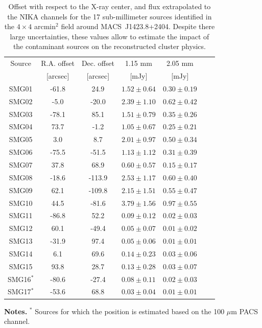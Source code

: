 \documentclass[twocolumn,traditabstract]{aa}
\begin{document}
\begin{table}[h]
\caption{Offset with respect to the X-ray center, and flux extrapolated to the NIKA channels for the 17 sub-millimeter sources identified in the $4 \times 4$ arcmin$^2$ field around \mbox{MACS~J1423.8+2404}. Despite there large uncertainties, these values allow to estimate the impact of the contaminant sources on the reconstructed cluster physics.}
\begin{center}
\begin{tabular}{ccccccc}
\hline
\hline
Source &  R.A. offset & Dec. offset & 1.15 mm & 2.05 mm\\
 &  [arcsec] & [arcsec] & [mJy] & [mJy] \\
\hline
SMG01 &    -61.8 &     24.9 & $    1.52 \pm     0.64$ & $    0.30 \pm     0.19$ \\
SMG02 &     -5.0 &    -20.0 & $    2.39 \pm     1.10$ & $    0.62 \pm     0.42$ \\
SMG03 &    -78.1 &     85.1 & $    1.51 \pm     0.79$ & $    0.35 \pm     0.26$ \\
SMG04 &     73.7 &     -1.2 & $    1.05 \pm     0.67$ & $    0.25 \pm     0.21$ \\
SMG05 &      3.0 &      8.7 & $    2.01 \pm     0.97$ & $    0.50 \pm     0.34$ \\
SMG06 &    -75.5 &    -51.5 & $    1.13 \pm     1.12$ & $    0.31 \pm     0.39$ \\
SMG07 &     37.8 &     68.9 & $    0.60 \pm     0.57$ & $    0.15 \pm     0.17$ \\
SMG08 &    -18.6 &   -113.9 & $    2.53 \pm     1.17$ & $    0.60 \pm     0.40$ \\
SMG09 &     62.1 &   -109.8 & $    2.15 \pm     1.51$ & $    0.55 \pm     0.47$ \\
SMG10 &     44.5 &    -81.6 & $    3.79 \pm     1.56$ & $    0.97 \pm     0.55$ \\
SMG11 &    -86.8 &     52.2 & $    0.09 \pm     0.12$ & $    0.02 \pm     0.03$ \\
SMG12 &     60.1 &    -49.4 & $    0.05 \pm     0.07$ & $    0.01 \pm     0.02$ \\
SMG13 &    -31.9 &     97.4 & $    0.05 \pm     0.06$ & $    0.01 \pm     0.01$ \\
SMG14 &      6.1 &     69.6 & $    0.14 \pm     0.23$ & $    0.03 \pm     0.06$ \\
SMG15 &     93.8 &     28.7 & $    0.13 \pm     0.28$ & $    0.03 \pm     0.07$ \\
SMG16$^*$ &    -80.6 &    -27.4 & $    0.08 \pm     0.11$ & $    0.02 \pm     0.03$ \\
SMG17$^*$ &    -53.6 &     68.8 & $    0.03 \pm     0.04$ & $    0.01 \pm     0.01$ \\
\hline
\end{tabular}
\end{center}
{\small {\bf Notes.} $^*$ Sources for which the position is estimated based on the 100 $\mu$m PACS channel.}
\label{tab:IR_ps2}
\end{table}
\end{document}
